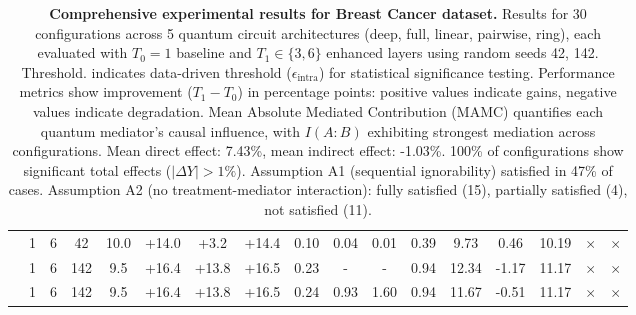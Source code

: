 \documentclass[
    reprint,
    amsmath, amssymb,
    aps,
    floatfix,
    nofootinbib
]{revtex4-1}
\begin{document}
\begin{table}[h!]
{\begin{tabular}{l|cc|c|c|ccc|cccc|ccc|cc}
 & 1 & 6 & 42 & 10.0 & +14.0 & +3.2 & +14.4 & 0.10 & 0.04 & 0.01 & 0.39 & 9.73 & 0.46 & 10.19 & $\times$ & $\times$ \\
 & 1 & 6 & 142 & 9.5 & +16.4 & +13.8 & +16.5 & 0.23 & - & - & 0.94 & 12.34 & -1.17 & 11.17 & $\times$ & $\times$ \\
 & 1 & 6 & 142 & 9.5 & +16.4 & +13.8 & +16.5 & 0.24 & 0.93 & 1.60 & 0.94 & 11.67 & -0.51 & 11.17 & $\times$ & $\times$ \\
\bottomrule
\hline
\end{tabular}}
\caption{\textbf{Comprehensive experimental results for Breast Cancer dataset.} Results for 30 configurations across 5 quantum circuit architectures (deep, full, linear, pairwise, ring), each evaluated with $T_0=1$ baseline and $T_1 \in \{3,6\}$ enhanced layers using random seeds {42, 142}. Threshold. indicates data-driven threshold ($\epsilon_{\text{intra}}$) for statistical significance testing. Performance metrics show improvement ($T_1 - T_0$) in percentage points: positive values indicate gains, negative values indicate degradation. Mean Absolute Mediated Contribution (MAMC) quantifies each quantum mediator's causal influence, with $I(A:B)$ exhibiting strongest mediation across configurations. Mean direct effect: 7.43\%, mean indirect effect: -1.03\%. 100\% of configurations show significant total effects ($|\Delta Y|>1\%$). Assumption A1 (sequential ignorability) satisfied in 47\% of cases. Assumption A2 (no treatment-mediator interaction): fully satisfied (15), partially satisfied (4), not satisfied (11).}
\label{tab:breast_cancer_comprehensive}
\end{table}
\end{document}
